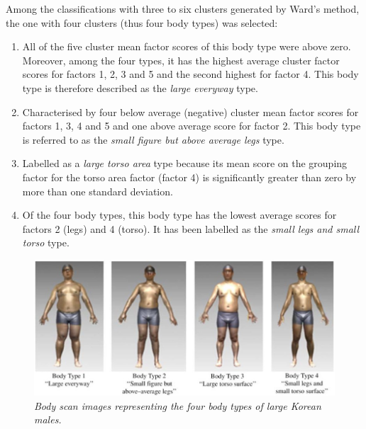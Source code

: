 \documentclass[12pt,a4paper,openany,UKenglish]{scrreprt}
\begin{document}
Among the classifications with three to six clusters generated by Ward's method, the one with four clusters (thus four body types) was selected:
\begin{enumerate}[label=\textbf{Type \arabic*:}, nolistsep]
	\item All of the five cluster mean factor scores of this body type were above zero.
	      Moreover, among the four types, it has the highest average cluster factor scores for factors 1, 2, 3 and 5 and the second highest for factor 4.
	      This body type is therefore described as the \textit{large everyway} type.
	\item Characterised by four below average (negative) cluster mean factor scores for factors 1, 3, 4 and 5 and one above average score for factor 2.
	      This body type is referred to as the \textit{small figure but above average legs} type.
	\item Labelled as a \textit{large torso area} type because its mean score on the grouping factor for the torso area factor (factor 4) is significantly greater than zero by more than one standard deviation.
	\item Of the four body types, this body type has the lowest average scores for factors 2 (legs) and 4 (torso).
	      It has been labelled as the \textit{small legs and small torso} type.
\end{enumerate}
\begin{figure}[H]
	\centering
	\caption{\footnotesize\centering\itshape Body scan images representing the four body types of large Korean males.}
	\includegraphics[width=.8\linewidth]{../Images/Park1}
\end{figure}
\end{document}
